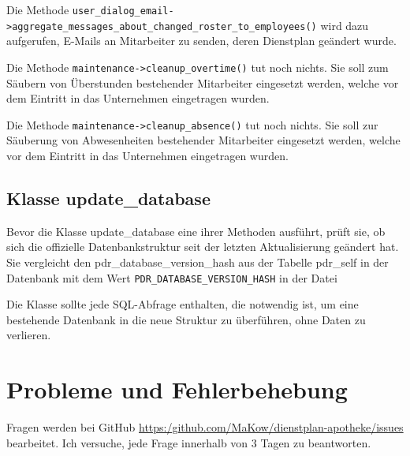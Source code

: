 Die Methode
\lstinline|user_dialog_email->aggregate_messages_about_changed_roster_to_employees()|
wird dazu aufgerufen, E-Mails an Mitarbeiter zu senden, deren Dienstplan
geändert wurde.

Die Methode  \lstinline|maintenance->cleanup_overtime()| tut noch
nichts. Sie soll zum Säubern von Überstunden bestehender Mitarbeiter
eingesetzt werden, welche vor dem Eintritt in das Unternehmen eingetragen
wurden.

Die Methode  \lstinline|maintenance->cleanup_absence()| tut noch nichts. Sie
soll zur Säuberung von Abwesenheiten bestehender Mitarbeiter eingesetzt
werden, welche vor dem Eintritt in das Unternehmen eingetragen wurden.


\subsection{Klasse update\_database}
Bevor die Klasse update\_database eine ihrer Methoden ausführt, prüft sie,
ob sich die offizielle Datenbankstruktur seit der letzten Aktualisierung
geändert hat.  Sie vergleicht den pdr\_database\_version\_hash aus der
Tabelle pdr\_self in der Datenbank mit dem Wert
\lstinline|PDR_DATABASE_VERSION_HASH| in der Datei

Die Klasse sollte jede SQL-Abfrage enthalten, die notwendig ist, um eine
bestehende Datenbank in die neue Struktur zu überführen, ohne Daten zu
verlieren.


\section{Probleme und Fehlerbehebung}
Fragen werden bei GitHub
\url{https:/github.com/MaKow/dienstplan-apotheke/issues} bearbeitet. Ich
versuche, jede Frage innerhalb von 3 Tagen zu beantworten.
